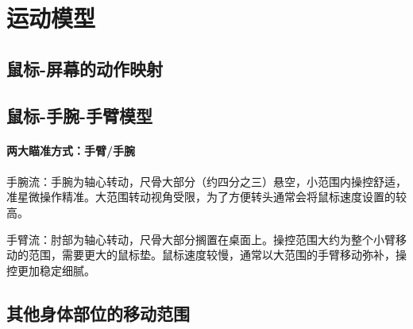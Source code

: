 \documentclass[UTF8]{ctexart}
\begin{document}
\section{运动模型}
\subsection{鼠标-屏幕的动作映射}

\subsection{鼠标-手腕-手臂模型}
    \paragraph{两大瞄准方式：手臂/手腕}
    \paragraph{}手腕流：手腕为轴心转动，尺骨大部分（约四分之三）悬空，小范围内操控舒适，准星微操作精准。大范围转动视角受限，为了方便转头通常会将鼠标速度设置的较高。

    手臂流：肘部为轴心转动，尺骨大部分搁置在桌面上。操控范围大约为整个小臂移动的范围，需要更大的鼠标垫。鼠标速度较慢，通常以大范围的手臂移动弥补，操控更加稳定细腻。
    \cite{zhihu_liupai}
\subsection{其他身体部位的移动范围}


    
\end{document}

